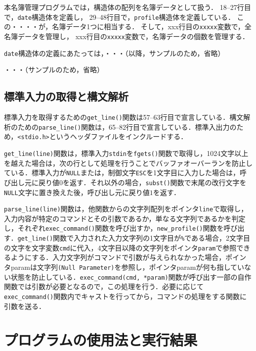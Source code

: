本名簿管理プログラムでは，構造体の配列を名簿データとして扱う．
18--27行目で，\verb|date|構造体を定義し，
29--48行目で，\verb|profile|構造体を定義している．
この・・・・が，名簿データ1つに相当する．
そして，xxx行目の\verb|xxxxx|変数で，全名簿データを管理し，
xxx行目の\verb|xxxxx|変数で，名簿データの個数を管理する．

\verb|date|構造体の定義にあたっては，・・・（以降，サンプルのため，省略）

・・・（サンプルのため，省略）

\subsection{標準入力の取得と構文解析}

標準入力を取得するための\verb|get_line()|関数は57--63行目で宣言している．構文解析のための\verb|parse_line()|関数は，65--82行目で宣言している．標準入出力のため，\verb|<stdio.h>|というヘッダファイルをインクルードする．

\verb|get_line(line)|関数は，標準入力\verb|stdin|を\verb|fgets()|関数で取得し，1024文字以上を越えた場合は，次の行として処理を行うことでバッファオーバーランを防止している．標準入力が\verb|NULL|または，制御文字\verb|ESC|を1文字目に入力した場合は，呼び出し元に戻り値$0$を返す．それ以外の場合，\verb|subst()|関数で末尾の改行文字を\verb|NULL|文字に置き換えた後，呼び出し元に戻り値$1$を返す．

\verb|parse_line(line)|関数は，他関数からの文字列配列をポインタ\verb|line|で取得し，入力内容が特定のコマンドとその引数であるか，単なる文字列であるかを判定し，それぞれ\verb|exec_command()|関数を呼び出すか，\verb|new_profile()|関数を呼び出す．\verb|get_line()|関数で入力された入力文字列の1文字目が\verb|%|である場合，2文字目の文字を文字変数\verb|cmd|に代入，4文字目以降の文字列をポインタ\verb|param|で参照できるようにする．入力文字列がコマンドで引数が与えられなかった場合，ポインタparamは文字列\verb|(Null Parameter)|を参照し，ポインタparamが何も指していない状態を防止している．\verb|exec_command(cmd, *param)|関数が呼び出す一部の自作関数では引数が必要となるので，この処理を行う．必要に応じて\verb|exec_command()|関数内でキャストを行ってから，コマンドの処理をする関数に引数を送る．


\section{プログラムの使用法と実行結果}\label{sec:howresult}

